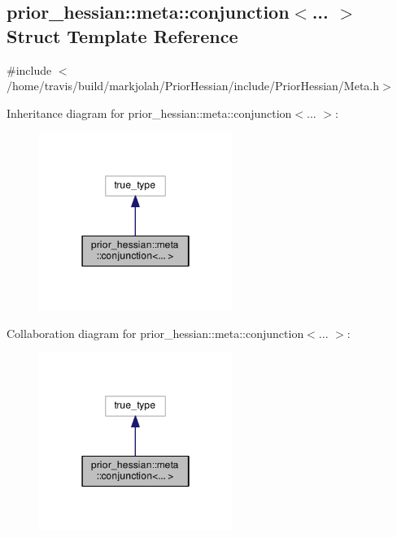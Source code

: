 \hypertarget{structprior__hessian_1_1meta_1_1conjunction}{}\subsection{prior\+\_\+hessian\+:\+:meta\+:\+:conjunction$<$... $>$ Struct Template Reference}
\label{structprior__hessian_1_1meta_1_1conjunction}


{\ttfamily \#include $<$/home/travis/build/markjolah/\+Prior\+Hessian/include/\+Prior\+Hessian/\+Meta.\+h$>$}



Inheritance diagram for prior\+\_\+hessian\+:\+:meta\+:\+:conjunction$<$... $>$\+:\nopagebreak
\begin{figure}[H]
\begin{center}
\leavevmode
\includegraphics[width=178pt]{structprior__hessian_1_1meta_1_1conjunction__inherit__graph}
\end{center}
\end{figure}


Collaboration diagram for prior\+\_\+hessian\+:\+:meta\+:\+:conjunction$<$... $>$\+:\nopagebreak
\begin{figure}[H]
\begin{center}
\leavevmode
\includegraphics[width=178pt]{structprior__hessian_1_1meta_1_1conjunction__coll__graph}
\end{center}
\end{figure}


